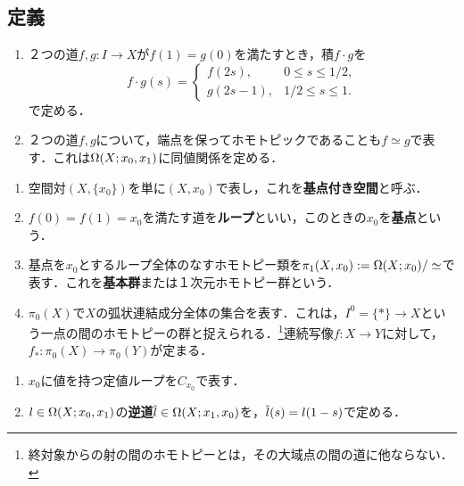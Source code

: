 \documentclass[uplatex,dvipdfmx]{jsreport}
\begin{document}
\subsection{定義}

\begin{definition}[path]\mbox{}
    \begin{enumerate}
        \item ２つの道$f,g:I\to X$が$f(1)=g(0)$を満たすとき，積$f\cdot g$を
        \[f\cdot g(s)=\begin{cases}
            f(2s),&0\le s\le 1/2,\\
            g(2s-1),&1/2\le s\le 1.
        \end{cases}\]
        で定める．
        \item ２つの道$f,g$について，端点を保ってホモトピックであることも$f\simeq g$で表す．これは$\Omega(X;x_0,x_1)$に同値関係を定める．
    \end{enumerate}
\end{definition}

\begin{definition}\mbox{}\label{def-0th-homotopy-set}
    \begin{enumerate}
        \item 空間対$(X,\{x_0\})$を単に$(X,x_0)$で表し，これを\textbf{基点付き空間}と呼ぶ．
        \item $f(0)=f(1)=x_0$を満たす道を\textbf{ループ}といい，このときの$x_0$を\textbf{基点}という．
        \item 基点を$x_0$とするループ全体のなすホモトピー類を$\pi_1(X,x_0):=\Omega(X;x_0)/\simeq$で表す．これを\textbf{基本群}または１次元ホモトピー群という．
        \item $\pi_0(X)$で$X$の弧状連結成分全体の集合を表す．これは，$I^0=\{*\}\to X$という一点の間のホモトピーの群と捉えられる．\footnote{終対象からの射の間のホモトピーとは，その大域点の間の道に他ならない．}連続写像$f:X\to Y$に対して，$f_*:\pi_0(X)\to\pi_0(Y)$が定まる．
    \end{enumerate}
\end{definition}

\begin{notation}\mbox{}
    \begin{enumerate}
        \item $x_0$に値を持つ定値ループを$C_{x_0}$で表す．
        \item $l\in\Omega(X;x_0,x_1)$の\textbf{逆道}$\overline{l}\in\Omega(X;x_1,x_0)$を，$\overline{l}(s)=l(1-s)$で定める．
    \end{enumerate}
\end{notation}
\end{document}
